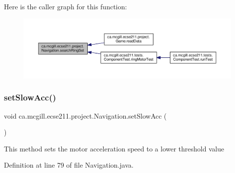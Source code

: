 Here is the caller graph for this function\+:\nopagebreak
\begin{figure}[H]
\begin{center}
\leavevmode
\includegraphics[width=350pt]{classca_1_1mcgill_1_1ecse211_1_1project_1_1_navigation_a1a808e665b8dd5b8e79b0580724d239c_icgraph}
\end{center}
\end{figure}
\mbox{\label{classca_1_1mcgill_1_1ecse211_1_1project_1_1_navigation_ab01db7b8a871acd45e7dd16922abc15e}} 
\subsubsection{\texorpdfstring{set\+Slow\+Acc()}{setSlowAcc()}}
{\footnotesize\ttfamily void ca.\+mcgill.\+ecse211.\+project.\+Navigation.\+set\+Slow\+Acc (\begin{DoxyParamCaption}{ }\end{DoxyParamCaption})}

This method sets the motor acceleration speed to a lower threshold value 

Definition at line 79 of file Navigation.\+java.



